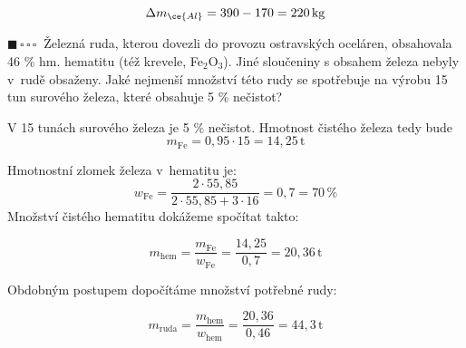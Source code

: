 \documentclass{book}
\newcommand{\jeden}{$\blacksquare \, \square \, \square \, \square \; \; $}
\renewenvironment{quotation}{\par}{\par} %
\begin{document}
\[
\Delta m_{\ce{Al}}=390-170=220\,\mathrm{kg}
\]


\hrulefill %
\begin{quotation}
\jeden Železná ruda, kterou dovezli do provozu ostravských oceláren, obsahovala
46 \% hm. hematitu (též krevele, Fe$_{2}$O$_{3}$). Jiné sloučeniny
s obsahem železa nebyly v~rudě obsaženy. Jaké nejmenší množství této
rudy se spotřebuje na výrobu 15 tun surového železa, které obsahuje
5 \% nečistot?
\end{quotation} \dotfill \par  


V 15 tunách surového železa je 5 \% nečistot. Hmotnost čistého železa
tedy bude 
\[
m_{\mathrm{Fe}}=0,95\cdot15=14,25\,\mathrm{t}
\]

Hmotnostní zlomek železa v~hematitu je: 
\[
w_{\mathrm{Fe}}=\frac{2\cdot55,85}{2\cdot55,85+3\cdot16}=0,7=70\,\%
\]
Množství čistého hematitu dokážeme spočítat takto:

\[
m_{\mathrm{hem}}=\frac{m_{\mathrm{Fe}}}{w_{\mathrm{Fe}}}=\frac{14,25}{0,7}=20,36\,\mathrm{t}
\]

Obdobným postupem dopočítáme množství potřebné rudy:

\[
m_{\mathrm{ruda}}=\frac{m_{\mathrm{hem}}}{w_{\mathrm{hem}}}=\frac{20,36}{0,46}=44,3\,\mathrm{t}
\]
\end{document}
